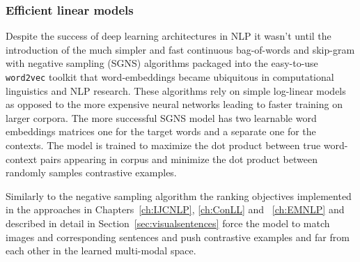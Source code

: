 




\subsubsection{Efficient linear models}
\label{sec:w2v}
Despite the success of deep learning architectures in NLP it wasn't until the introduction
of the much simpler and fast continuous bag-of-words
and skip-gram with negative sampling (SGNS) algorithms \cite{mikolov2013efficient}
packaged into the easy-to-use \texttt{word2vec}
toolkit that
word-embeddings became ubiquitous in computational linguistics and NLP research.
These algorithms rely on simple log-linear models as opposed to the more expensive
neural networks leading to faster training on larger corpora. The more successful SGNS
model has two learnable word embeddings matrices one for the target words
and a separate one for the contexts.
The model is trained to maximize the dot product
between true word-context pairs appearing in corpus and minimize the
dot product between randomly
samples contrastive examples. 


Similarly to the negative sampling algorithm the ranking objectives
implemented in the approaches in Chapters~\ref{ch:IJCNLP}, \ref{ch:ConLL} and ~\ref{ch:EMNLP}
and described in detail in Section~\ref{sec:visualsentences} force the model
to match images and corresponding sentences and push contrastive examples
and  far from each other in the learned multi-modal space.


